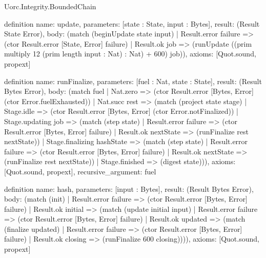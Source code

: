 \begin{lexlean}{Uorc.Integrity.BoundedChain}
\begin{semanticmodule}
definition{
  name: update,
  parameters: [state : State, input : Bytes],
  result: (Result State Error),
  body: (match (beginUpdate state input)
    | Result.error failure => (ctor Result.error [State, Error] failure)
    | Result.ok job => (runUpdate ((prim multiply 12 (prim length input : Nat) : Nat) + 600) job)),
  axioms: [Quot.sound, propext]
}

definition{
  name: runFinalize,
  parameters: [fuel : Nat, state : State],
  result: (Result Bytes Error),
  body: (match fuel
    | Nat.zero => (ctor Result.error [Bytes, Error] (ctor Error.fuelExhausted))
    | Nat.succ rest => (match (project state stage)
      | Stage.idle => (ctor Result.error [Bytes, Error] (ctor Error.notFinalized))
      | Stage.updating job => (match (step state)
        | Result.error failure => (ctor Result.error [Bytes, Error] failure)
        | Result.ok nextState => (runFinalize rest nextState))
      | Stage.finalizing hashState => (match (step state)
        | Result.error failure => (ctor Result.error [Bytes, Error] failure)
        | Result.ok nextState => (runFinalize rest nextState))
      | Stage.finished => (digest state))),
  axioms: [Quot.sound, propext],
  recursive_argument: fuel
}

definition{
  name: hash,
  parameters: [input : Bytes],
  result: (Result Bytes Error),
  body: (match (init)
    | Result.error failure => (ctor Result.error [Bytes, Error] failure)
    | Result.ok initial => (match (update initial input)
      | Result.error failure => (ctor Result.error [Bytes, Error] failure)
      | Result.ok updated => (match (finalize updated)
        | Result.error failure => (ctor Result.error [Bytes, Error] failure)
        | Result.ok closing => (runFinalize 600 closing)))),
  axioms: [Quot.sound, propext]
}
\end{semanticmodule}
\end{lexlean}

